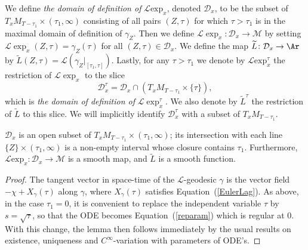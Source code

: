 \begin{definition}\label{def:l-exponential-map}
\label{defnD}
We define {\em the domain of definition of} ${\mathcal L}\mathrm{exp}_x$,  denoted ${\mathcal D}_x$, to be the
subset of $T_xM_{T-\tau_1}\times (\tau_1,\infty)$ consisting of all pairs
$(Z,\tau)$ for which $\tau> \tau_1$ is in the maximal domain of definition of
$\gamma_Z$.  Then we define $\mathcal{L}\exp_{x}\colon {\mathcal D}_x\to
{\mathcal M}$ by setting $\mathcal{L}\exp_{x}(Z,\tau) = \gamma_{Z}(\tau)$
for all $(Z,\tau)\in {\mathcal D}_x$. We
define the map $\widetilde L\colon {\mathcal D}_x\to \Ar$
by $\widetilde L(Z,\tau)={\mathcal L}\left(\gamma_Z|_{[\tau_1,\tau]}\right)$.
Lastly, for any $\tau> \tau_1$ we denote by ${\mathcal L}\mathrm{exp}_x^\tau$ the restriction of
${\mathcal L}\exp_x$ to the slice
$${\mathcal
D}^\tau_x={\mathcal D}_x\cap \left(T_xM_{T-\tau_1}\times \{\tau\}\right),$$
which is {\em the domain of definition of} ${\mathcal L}\exp_x^\tau$. We
also denote by  $\widetilde L^\tau$ the
restriction of $\widetilde L$ to this slice. We will implicitly identify
${\mathcal D}_x^\tau$ with a subset of $T_xM_{T-\tau_1}$.
\end{definition}



\begin{lemma}\label{lem:l-exponential-smooth}
\label{lcdiffeo}
${\mathcal D}_x$ is an open subset of $T_xM_{T-\tau_1}\times (\tau_1,\infty)$;
its intersection with each line $\{Z\}\times (\tau_1,\infty)$ is a non-empty
interval whose closure contains $\tau_1$. Furthermore, ${\mathcal L}\mathrm{exp}_x\colon {\mathcal D}_x\to {\mathcal M}$ is a smooth map, and $\widetilde
L$ is a smooth function.
\end{lemma}

\begin{proof}
The tangent vector in space-time of  the ${\mathcal L}$-geodesic
$\gamma$ is the vector field $-\chi+X_\gamma(\tau)$ along $\gamma$,
where $X_\gamma(\tau)$ satisfies Equation~(\ref{EulerLag}). As
above, in the case $\tau_1=0$, it is convenient to replace the
independent variable $\tau$ by $s=\sqrt{\tau}$, so that the ODE
becomes Equation~(\ref{reparam}) which is regular at $0$. With this
change, the lemma then follows immediately by the usual results on
existence, uniqueness and $C^\infty$-variation with parameters of
ODE's.
\end{proof}



